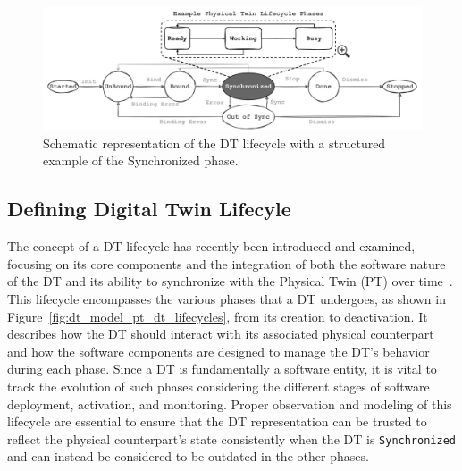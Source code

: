 \begin{figure}[t]
    \setlength{\belowcaptionskip}{-13pt}
    \centering
    \includegraphics[width=\textwidth]{figures/dt-lifecycle/dt_lifecycle_pt_sync.pdf}
    \caption{Schematic representation of the DT lifecycle with a structured example of the Synchronized phase.}
    \label{fig:dt_lifecycle_pt_sync}
\end{figure}



\subsection{Defining Digital Twin Lifecyle}

The concept of a DT lifecycle has recently been introduced and examined, focusing on its core components and the integration of both the software nature of the DT and its ability to synchronize with the Physical Twin (PT) over time~\cite{web_of_dt}.
This lifecycle encompasses the various phases that a DT undergoes, as shown in Figure~\ref{fig:dt_model_pt_dt_lifecycles}, from its creation to deactivation. It describes how the DT should interact with its associated physical counterpart and how the software components are designed to manage the DT's behavior during each phase.
Since a DT is fundamentally a software entity, it is vital to track the evolution of such phases considering the different stages of software deployment, activation, and monitoring.
Proper observation and modeling of this lifecycle are essential to ensure that the DT representation can be trusted to reflect the physical counterpart's state consistently when the DT is \texttt{Synchronized} and can instead be considered to be outdated in the other phases.

